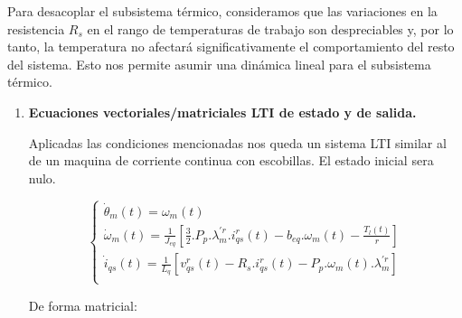 \documentclass{article}
\begin{document}
Para desacoplar el subsistema térmico, consideramos que las variaciones en la resistencia \(R_s\) 
en el rango de temperaturas de trabajo son despreciables y, por lo tanto, la temperatura no 
afectará significativamente el comportamiento del resto del sistema. Esto nos permite asumir 
una dinámica lineal para el subsistema térmico.

\begin{enumerate}[label=\roman*.]
    \item \textbf{Ecuaciones vectoriales/matriciales LTI de estado y de salida.} 
    
    Aplicadas las condiciones mencionadas nos queda un sistema LTI similar al de un maquina 
    de corriente continua con escobillas. El estado inicial sera nulo.

    \begin{equation}\label{eq.lti}
        \begin{cases}
            \dot{\theta}_{m}(t) = \omega_{m}(t)\\
            \dot{\omega}_{m}(t) = \frac{1}{J_{eq}}[\frac{3}{2}.P_{p}.\lambda_{m}^{\prime r}.i_{qs}^r(t) - b_{eq}.\omega_{m}(t) - \frac{T_{l}(t)}{r}]\\
            \dot{i}_{qs}(t) = \frac{1}{L_{q}}[v_{qs}^r(t) - R_{s}.i_{qs}^r(t) - P_{p}.\omega_{m}(t).\lambda_{m}^{\prime r}]  \\
        \end{cases}
    \end{equation}

    De forma matricial:


\end{enumerate}
\end{document}
